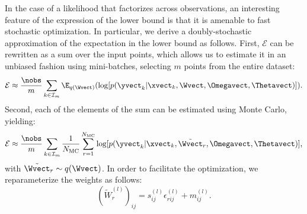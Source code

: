 In the case of a likelihood that factorizes across observations, an interesting feature of the expression of the lower bound is that it is amenable to fast stochastic optimization. 
In particular, we derive a doubly-stochastic approximation of the expectation in the lower bound as follows. 
First, $\mathcal{E}$ can be rewritten as a sum over the input points, which allows us to estimate it in an unbiased fashion using mini-batches, selecting $m$ points from the entire dataset:
\begin{equation}
\mathcal{E} \approx \frac{\nobs}{m} \sum_{k \in \mathcal{I}_m} \E_{q(\Wvect)} ( \log[ p(\yvect_k | \xvect_k, \Wvect, \Omegavect, \Thetavect) ] ) \text{.}
\end{equation}
Second, each of the elements of the sum can be estimated using Monte Carlo, yielding:
\begin{equation}
\mathcal{E} \approx
\frac{\nobs}{m} \sum_{k \in \mathcal{I}_m} \frac{1}{N_{\mathrm{MC}}} \sum_{r = 1}^{N_{\mathrm{MC}}}  \log[ p(\yvect_k | \xvect_k, \tilde{\Wvect}_r, \Omegavect, \Thetavect) ] \text{,}
\end{equation}
with $\tilde{\Wvect}_r \sim q(\Wvect)$.
In order to facilitate the optimization, we reparameterize the weights as follows:
\begin{equation}
(\tilde{W}^{(l)}_{r})_{ij} = s^{(l)}_{ij}  \epsilon^{(l)}_{rij} + m^{(l)}_{ij} \text{.}
\end{equation}

